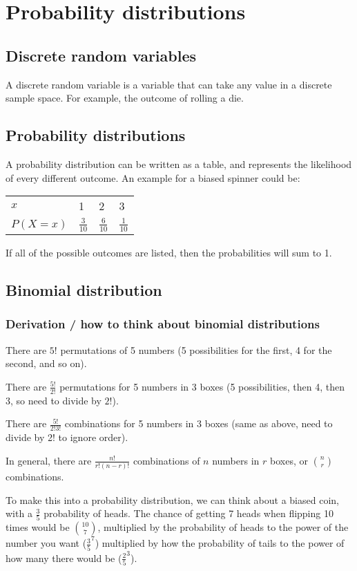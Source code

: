 \section{Probability distributions}
\subsection{Discrete random variables}
A discrete random variable is a variable that can take any value in a discrete sample space. For example, the outcome of rolling a die.
\subsection{Probability distributions}
A probability distribution can be written as a table, and represents the likelihood of every different outcome. An example for a biased spinner could be:
\begin{table}[ht]
\begin{tabular}{llll}
$x$      & 1              & 2              & 3              \\
$P(X=x)$ & $\frac{3}{10}$ & $\frac{6}{10}$ & $\frac{1}{10}$
\end{tabular}
\end{table}
If all of the possible outcomes are listed, then the probabilities will sum to 1.

\subsection{Binomial distribution}
\subsubsection{Derivation / how to think about binomial distributions}
There are $5!$ permutations of 5 numbers (5 possibilities for the first, 4 for the second, and so on).

There are $\frac{5!}{2!}$ permutations for 5 numbers in 3 boxes (5 possibilities, then 4, then 3, so need to divide by $2!$).

There are $\frac{5!}{2!3!}$ combinations for 5 numbers in 3 boxes (same as above, need to divide by 2! to ignore order).

In general, there are $\frac{n!}{r!(n-r)!}$ combinations of $n$ numbers in $r$ boxes, or $\binom{n}{r}$ combinations.

To make this into a probability distribution, we can think about a biased coin, with a $\frac{3}{5}$ probability of heads. The chance of getting 7 heads when flipping 10 times would be $\binom{10}{7}$, multiplied by the probability of heads to the power of the number you want ($\frac{3}{5}^7$) multiplied by how the probability of tails to the power of how many there would be ($\frac{2}{5}^3$).


